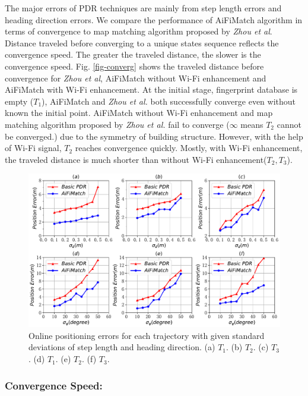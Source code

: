 \documentclass{llncs}
\begin{document}
The major errors of PDR techniques are mainly from step length errors and heading direction errors. We compare the performance of AiFiMatch algorithm in terms of convergence to map matching algorithm proposed by \emph{Zhou et al}. Distance traveled before converging to a unique states sequence reflects the convergence speed. The greater the traveled distance, the slower is the convergence speed. Fig. \ref{fig-converg} shows the traveled distance before convergence for \emph{Zhou et al}, AiFiMatch without Wi-Fi enhancement and AiFiMatch with Wi-Fi enhancement. At the initial stage, fingerprint database is empty ($T_1$), AiFiMatch and \emph{Zhou et al.} both successfully converge even without known the initial point. AiFiMatch without Wi-Fi enhancement and map matching algorithm proposed by \emph{Zhou et al.} fail to converge ($\infty$ means $T_2$ cannot be converged.) due to the symmetry of building structure. However, with the help of Wi-Fi signal, $T_2$ reaches convergence quickly. Mostly, with Wi-Fi enhancement, the traveled distance is much shorter than without Wi-Fi enhancement($T_2, T_3$). 

\begin{figure}[!htbp]
	\centering
	\includegraphics[width=4.56in]{AiFiMatch-ErrInfluence}
	\caption{Online positioning errors for each trajectory with given standard deviations of step length and heading direction. (a) $T_1$. (b) $T_2$. (c) $T_3$. (d) $T_1$. (e) $T_2$. (f) $T_3$.}
	\label{fig-errinfluence}
\end{figure}

\subsubsection{Convergence Speed:}
\end{document}
